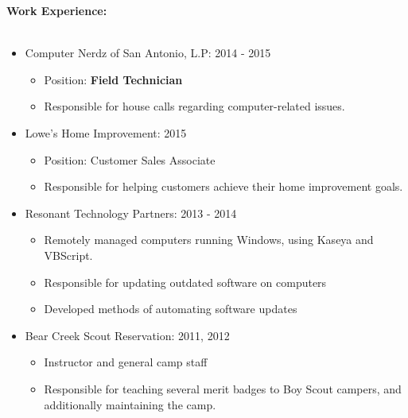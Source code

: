 \documentclass[12pt]{article}
\begin{document}
\begin{flushleft}
\textbf{Work Experience:}\\
\vspace{-11pt}\hrulefill\\\vspace{-1.1mm}
\begin{itemize}\vspace{-0mm}
\item Computer Nerdz of San Antonio, L.P: \hfill 2014 - 2015\\
	\begin{itemize}
	\item Position: \textbf{Field Technician}\\
	\item Responsible for house calls regarding computer-related issues.\\
	\end{itemize}
\item Lowe's Home Improvement: \hfill 2015\\
	\begin{itemize}
	\item Position: Customer Sales Associate\\
	\item Responsible for helping customers achieve their home improvement goals.
	\end{itemize}
\item Resonant Technology Partners: \hfill 2013 - 2014\\
	\begin{itemize}
	\item Remotely managed computers running Windows, using Kaseya and VBScript.
	\item Responsible for updating outdated software on computers
	\item Developed methods of automating software updates
	\end{itemize}
\item Bear Creek Scout Reservation: \hfill 2011, 2012\\
	\begin{itemize}
	\item Instructor and general camp staff
	\item Responsible for teaching several merit badges to Boy Scout campers, and additionally maintaining the camp.
	\end{itemize}
\end{itemize}


\end{flushleft}
\end{document}
